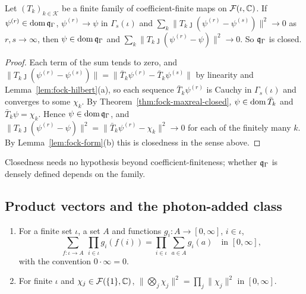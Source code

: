 \begin{vetbenv}
\begin{theorem}\label{thm:fock-form-closed}
Let $(T_k)_{k\in\mathcal K}$ be a finite family of coefficient-finite maps on $\mathcal F(\iota,\mathbb C)$. If
$\psi^{(r)}\in\operatorname{dom}\mathfrak q_\Gamma$, $\psi^{(r)}\to\psi$ in $\Gamma_s(\iota)$ and $\sum_k\lVert
T_k\jmath(\psi^{(r)}-\psi^{(s)})\rVert^2\to0$ as $r,s\to\infty$, then $\psi\in\operatorname{dom}\mathfrak q_\Gamma$ and
$\sum_k\lVert T_k\jmath(\psi^{(r)}-\psi)\rVert^2\to0$. So $\mathfrak q_\Gamma$ is closed.
\end{theorem}

\begin{proof}
Each term of the sum tends to zero, and $\lVert T_k\jmath(\psi^{(r)}-\psi^{(s)})\rVert=\lVert\bar
T_k\psi^{(r)}-\bar T_k\psi^{(s)}\rVert$ by linearity and Lemma~\ref{lem:fock-hilbert}(a), so each sequence
$\bar T_k\psi^{(r)}$ is Cauchy in $\Gamma_s(\iota)$ and converges to some $\chi_k$. By
Theorem~\ref{thm:fock-maxreal-closed}, $\psi\in\operatorname{dom}\bar T_k$ and $\bar T_k\psi=\chi_k$. Hence
$\psi\in\operatorname{dom}\mathfrak q_\Gamma$, and $\lVert T_k\jmath(\psi^{(r)}-\psi)\rVert^2=\lVert\bar T_k\psi^{(r)}-\chi_k
\rVert^2\to0$ for each of the finitely many $k$. By Lemma~\ref{lem:fock-form}(b) this is closedness in
the sense above.
\end{proof}

 Closedness needs no hypothesis beyond coefficient-finiteness; whether $\mathfrak q_\Gamma$ is densely defined
depends on the family.

\subsection{Product vectors and the photon-added class}\label{sec:fock-photon}

\begin{lemma}\label{lem:fock-tensornorm}
\begin{enumerate}
\item[(a)] For a finite set $\iota$, a set $A$ and functions $g_i:A\to[0,\infty]$, $i\in\iota$,
\[
 \sum_{f:\iota\to A}\ \prod_{i\in\iota}g_i(f(i))=\prod_{i\in\iota}\ \sum_{a\in A}g_i(a)\quad\text{in }[0,\infty],
\]
with the convention $0\cdot\infty=0$.
\item[(b)] For finite $\iota$ and $\chi_j\in\mathcal F(\{1\},\mathbb C)$, $\lVert\bigotimes_j\chi_j\rVert^2=\prod_j
\lVert\chi_j\rVert^2$ in $[0,\infty]$.
\end{enumerate}
\end{lemma}


\end{vetbenv}
